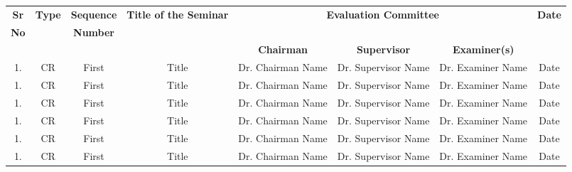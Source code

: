 \begin{small}
\begin{longtable}{|c|c|c|c|c|c|c|c|}

	\hline
	\textbf{Sr} &
	\textbf{Type} &
	\textbf{Sequence} &
	\textbf{Title of the Seminar} &
	\multicolumn{3}{|c|}{\textbf{Evaluation Committee}} &
	\textbf{Date} \\
	\textbf{No} &
	\textbf{} &
	\textbf{Number} &
	\textbf{} &
	\multicolumn{3}{|c|}{} &
	\textbf{} \\ \hline
	\textbf{} &
	\textbf{} &
	\textbf{} &
	\textbf{} &
	\textbf{Chairman} &
	\textbf{Supervisor} &
	\textbf{Examiner(s)} &
	\textbf{} \\ \hline
	1. &										   %
	CR &									  	   %
	First &										   %
	Title  &							     	   %
	Dr. Chairman Name&						 	   %
	Dr. Supervisor Name&					 	   %
	Dr. Examiner Name&						  	   %
	Date \\ \hline										   %
	1. &										   %
	CR &									  	   %
	First &										   %
	Title  &							     	   %
	Dr. Chairman Name&						 	   %
	Dr. Supervisor Name&					 	   %
	Dr. Examiner Name&						  	   %
	Date \\ \hline										   %
	1. &										   %
	CR &									  	   %
	First &										   %
	Title  &							     	   %
	Dr. Chairman Name&						 	   %
	Dr. Supervisor Name&					 	   %
	Dr. Examiner Name&						  	   %
	Date \\ \hline										   %
	1. &										   %
	CR &									  	   %
	First &										   %
	Title  &							     	   %
	Dr. Chairman Name&						 	   %
	Dr. Supervisor Name&					 	   %
	Dr. Examiner Name&						  	   %
	Date \\ \hline										   %
	1. &										   %
	CR &									  	   %
	First &										   %
	Title  &							     	   %
	Dr. Chairman Name&						 	   %
	Dr. Supervisor Name&					 	   %
	Dr. Examiner Name&						  	   %
	Date \\ \hline										   %
	1. &										   %
	CR &									  	   %
	First &										   %
	Title  &							     	   %
	Dr. Chairman Name&						 	   %
	Dr. Supervisor Name&					 	   %
	Dr. Examiner Name&						  	   %
	Date \\ \hline										   %

\end{longtable}
\end{small}
